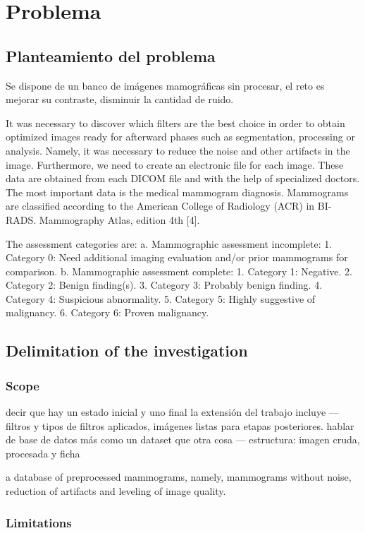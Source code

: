 \section{Problema}
\subsection{Planteamiento del problema}

Se dispone de un banco de imágenes mamográficas sin procesar, el reto es mejorar
su contraste, disminuir la cantidad de ruido.

It was necessary to discover which filters are the best choice in order to
obtain optimized images ready for afterward phases such as segmentation,
processing or analysis. Namely, it was necessary to reduce the noise and other
artifacts in the image. Furthermore, we need to create an electronic file for
each image. These data are obtained from each DICOM file and with the help of
specialized doctors.  The most important data is the medical mammogram
diagnosis. Mammograms are classified according to the American College of
Radiology (ACR) in BI-RADS. Mammography Atlas, edition 4th [4].

The assessment categories are:
a. Mammographic assessment incomplete:
1. Category 0: Need additional imaging evaluation and/or prior mammograms for comparison.
b. Mammographic assessment complete:
1. Category 1: Negative.
2. Category 2: Benign finding(s).
3. Category 3: Probably benign finding.
4. Category 4: Suspicious abnormality.
5. Category 5: Highly suggestive of malignancy.         
6. Category 6: Proven malignancy.

\subsection{Delimitation of the investigation}
\subsubsection{Scope}

decir que hay un estado inicial y uno final
la extensión del trabajo incluye --- filtros y tipos de filtros aplicados, imágenes listas para etapas posteriores. 
hablar de base de datos más como un dataset que otra cosa --- estructura: imagen cruda, procesada y ficha

a database of preprocessed mammograms, namely, mammograms without noise,
reduction of artifacts and leveling of image quality.

\subsubsection{Limitations}

